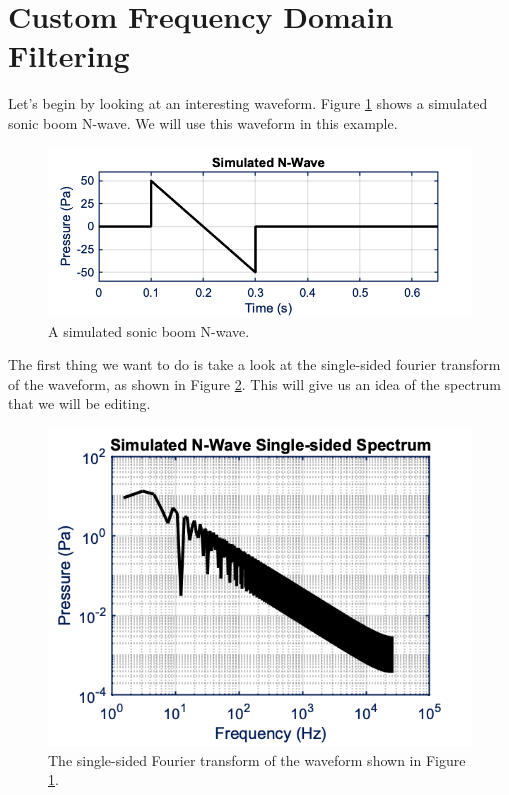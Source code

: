 \section{Custom Frequency Domain Filtering}

Let's begin by looking at an interesting waveform. Figure \ref{fig:Simulated N-Wave} shows a simulated sonic boom N-wave. We will use this waveform in this example.

\begin{figure}[H]
    \centering
    \includegraphics[width = 5 in]{Chapters/Signal Processing/Figures/Simulated N-Wave.png}
    \caption{A simulated sonic boom N-wave.}
    \label{fig:Simulated N-Wave}
\end{figure}

The first thing we want to do is take a look at the single-sided fourier transform of the waveform, as shown in Figure \ref{fig:Simulated N-wave Single-sided Spectrum}. This will give us an idea of the spectrum that we will be editing.

\begin{figure}[H]
    \centering
    \includegraphics[width = 4 in]{Chapters/Signal Processing/Figures/Simulated N-Wave Single-sided Spectrum.png}
    \caption{The single-sided Fourier transform of the waveform shown in Figure \ref{fig:Simulated N-Wave}.}
    \label{fig:Simulated N-wave Single-sided Spectrum}
\end{figure}

